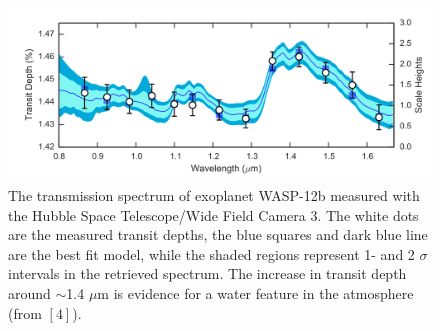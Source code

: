 \documentclass[12pt, letterpaper]{article}
\begin{document}
\begin{figure}[h!]
\centering
\vspace{-0.2in}
\includegraphics[width=\textwidth]{water_spectrum}
\vspace{-0.2in}
\caption{The transmission spectrum of exoplanet WASP-12b measured with the Hubble Space Telescope/Wide Field Camera 3. The white dots are the measured transit depths, the blue squares and dark blue line are the best fit model, while the shaded regions represent 1- and 2 $\sigma$ intervals in the retrieved spectrum. The increase in transit depth around $\sim$1.4 $\mu$m is evidence for a water feature in the atmosphere (from $[4]$).}
\label{fig:HLTau}
\end{figure}


\end{document}
